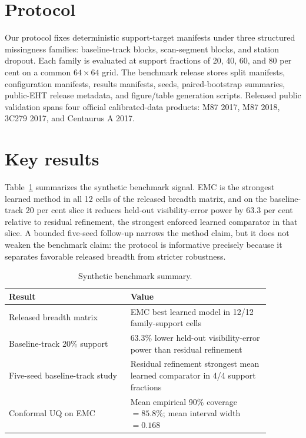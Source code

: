 \documentclass{article}
\begin{document}
\section{Protocol}

Our protocol fixes deterministic support-target manifests under three structured missingness families: baseline-track blocks, scan-segment blocks, and station dropout. Each family is evaluated at support fractions of 20, 40, 60, and 80 per cent on a common $64\times64$ grid. The benchmark release stores split manifests, configuration manifests, results manifests, seeds, paired-bootstrap summaries, public-EHT release metadata, and figure/table generation scripts. Released public validation spans four official calibrated-data products: M87 2017, M87 2018, 3C279 2017, and Centaurus A 2017.

\section{Key results}

Table~\ref{tab:synthetic} summarizes the synthetic benchmark signal. EMC is the strongest learned method in all 12 cells of the released breadth matrix, and on the baseline-track 20 per cent slice it reduces held-out visibility-error power by 63.3 per cent relative to residual refinement, the strongest enforced learned comparator in that slice. A bounded five-seed follow-up narrows the method claim, but it does not weaken the benchmark claim: the protocol is informative precisely because it separates favorable released breadth from stricter robustness.

\begin{table}[t]
\caption{Synthetic benchmark summary.}
\label{tab:synthetic}
\centering
\small
\begin{tabular}{p{0.41\linewidth}p{0.47\linewidth}}
\toprule
Result & Value \\
\midrule
Released breadth matrix & EMC best learned model in 12/12 family-support cells \\
Baseline-track 20\% support & 63.3\% lower held-out visibility-error power than residual refinement \\
Five-seed baseline-track study & Residual refinement strongest mean learned comparator in 4/4 support fractions \\
Conformal UQ on EMC & Mean empirical 90\% coverage $=85.8\%$; mean interval width $=0.168$ \\
\bottomrule
\end{tabular}
\end{table}
\end{document}
